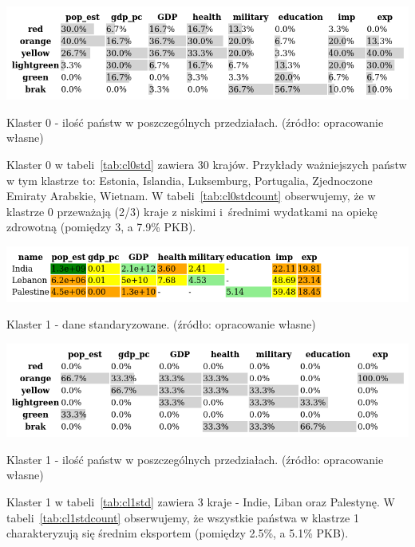 \documentclass[11pt]{report}
\begin{document}
    \begin{table}[!htp]
        \centering
        \includegraphics[width=\linewidth]{tables/CLUST/cluster0stdkmeanscount.png}
        \caption{Klaster 0 - ilość państw w poszczególnych przedziałach. (źródło: opracowanie własne)}
        \label{tab:cl0stdcount}
    \end{table}

    Klaster 0 w tabeli~\ref{tab:cl0std} zawiera 30 krajów.
    Przykłady ważniejszych państw w tym klastrze to: Estonia, Islandia, Luksemburg, Portugalia, Zjednoczone Emiraty Arabskie, Wietnam.
    W tabeli~\ref{tab:cl0stdcount} obserwujemy, że w klastrze 0 przeważają (2/3) kraje z niskimi i~średnimi wydatkami na opiekę zdrowotną (pomiędzy 3, a 7.9\% PKB).

    \begin{table}[!htp]
        \centering
        \includegraphics[width=\linewidth]{tables/CLUST/cluster1stdkmeans.png}
        \caption{Klaster 1 - dane standaryzowane. (źródło: opracowanie własne)}
        \label{tab:cl1std}
    \end{table}

    \begin{table}[!htp]
        \centering
        \includegraphics[width=\linewidth]{tables/CLUST/cluster1stdkmeanscount.png}
        \caption{Klaster 1 - ilość państw w poszczególnych przedziałach. (źródło: opracowanie własne)}
        \label{tab:cl1stdcount}
    \end{table}

    Klaster 1 w tabeli~\ref{tab:cl1std} zawiera 3 kraje - Indie, Liban oraz Palestynę.
    W tabeli~\ref{tab:cl1stdcount} obserwujemy, że wszystkie państwa w klastrze 1 charakteryzują się średnim eksportem (pomiędzy 2.5\%, a 5.1\% PKB).
\end{document}

